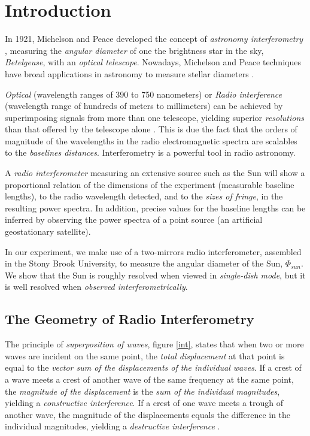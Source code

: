 \section{Introduction}

In 1921, Michelson and Peace developed the concept of {\it astronomy interferometry} \cite{michel}, measuring the {\it angular diameter} of one the brightness star in the sky, {\it Betelgeuse}, with an {\it optical telescope}. Nowadays,  Michelson and Peace techniques have broad applications in astronomy to measure stellar diameters \cite{sbu}.

{\it Optical} (wavelength ranges of 390 to 750 nanometers) or {\it Radio interference} (wavelength range of hundreds of meters to millimeters) \cite{wiki} can be achieved by superimposing signals from more than one telescope, yielding superior {\it resolutions} than that offered by the telescope alone \cite{brand}. This is due the fact that the orders of magnitude of the wavelengths in the radio electromagnetic spectra are scalables to the {\it baselines distances}. Interferometry is a powerful tool in radio astronomy. 

A {\it radio interferometer} measuring an extensive source such as the Sun will show a proportional relation of the dimensions of the experiment (\ie measurable baseline lengths), to the radio wavelength detected, and  to the {\it sizes of fringe}, in the resulting power spectra. In addition, precise values for the baseline lengths can be inferred by observing the power spectra of a point source (\eg an artificial geostationary satellite).

In our experiment, we make use of a two-mirrors  radio interferometer, assembled in the Stony Brook University\cite{sbu}, to measure the angular diameter of the Sun, $\Phi_{sun}$. We show that the Sun is roughly resolved when viewed in {\it single-dish mode}, but it is well resolved when {\it observed interferometrically}. 
\bigskip


\subsection{The Geometry of Radio Interferometry}

The principle of {\it superposition of waves}, figure \ref{int}, states that when two or more waves are incident on the same point, the {\it total displacement} at that point is equal to the {\it vector sum of the displacements of the individual waves}. If a crest of a wave meets a crest of another wave of the same frequency at the same point, the {\it magnitude of the displacement} is the {\it sum of the individual magnitudes}, yielding a {\it constructive interference}. If a crest of one wave meets a trough of another wave, the magnitude of the displacements equals the difference in the individual magnitudes, yielding a {\it  destructive interference} \cite{brand}.

